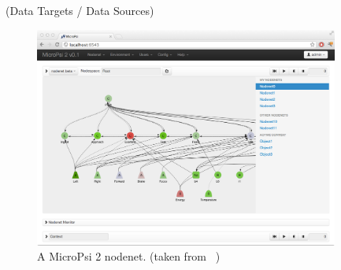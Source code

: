 (Data Targets / Data Sources)


\begin{figure}[h]
  \centering
    \includegraphics[width=10cm]{graphics/micropsi2_nodenet}
  \caption{A MicroPsi 2 nodenet. (taken from ~\cite{conf/agi/Bach12})}
  \label{micropsi2_nodenet}
\end{figure}